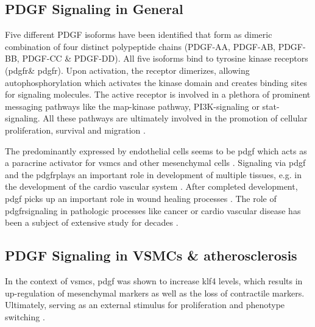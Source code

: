    \subsection{PDGF Signaling in General}
    \label{subsec:pdgf_the_cytokine}
    Five different PDGF isoforms have been identified that form as dimeric combination of four distinct polypeptide chains (PDGF-AA, PDGF-AB, PDGF-BB, PDGF-CC \& PDGF-DD). All five isoforms bind to tyrosine kinase receptors (\ac{pdgfr}\alpha \& \ac{pdgfr}\beta). Upon activation, the receptor dimerizes, allowing autophosphorylation which activates the kinase domain and creates binding sites for signaling molecules. The active receptor is involved in a plethora of prominent messaging pathways like the \ac{map}-kinase pathway, \ac{PI3K}-signaling or \ac{stat}-signaling. All these pathways are ultimately involved in the promotion of cellular proliferation, survival and migration \cite{chenPlateletderivedGrowthFactors2013, heldinTargetingPDGFSignaling2013, huTargetingPlateletderivedGrowth2015}.

    The predominantly expressed by endothelial cells seems to be \ac{pdgf} \cite{andraeRolePlateletderivedGrowth2008, heldinTargetingPDGFSignaling2013} which acts as a paracrine activator for \acp{vsmc} and other mesenchymal cells \cite{heldinTargetingPDGFSignaling2013}. Signaling via \ac{pdgf} and the \ac{pdgfr}\beta plays an important role in development of multiple tissues, e.g. in the development of the cardio vascular system \cite{leveenMiceDeficientPDGF1994}. After completed development, \ac{pdgf} picks up an important role in wound healing processes \cite{robsonPlateletderivedGrowthFactor1992}. The role of \ac{pdgfr}\beta signaling in pathologic processes like cancer or cardio vascular disease has been a subject of extensive study for decades \cite{heldinTargetingPDGFSignaling2013, rainesPDGFCardiovascularDisease2004}.

    \subsection{PDGF Signaling in VSMCs \& atherosclerosis}
    \label{subsec:pdgf_in_disease}
    In the context of \acp{vsmc}, \ac{pdgf} was shown to increase \ac{klf4} levels, which results in up-regulation of mesenchymal markers as well as the loss of contractile markers. Ultimately, serving as an external stimulus for proliferation and phenotype switching \cite{yapSixShadesVascular2021}.


